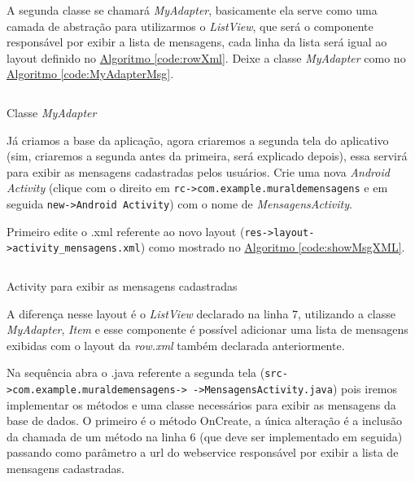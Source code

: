 \documentclass[a4paper,12pt,brazil,oneside]{book}
\begin{document}
A segunda classe se chamará \emph{MyAdapter}, basicamente ela serve como uma camada de abstração para utilizarmos o \emph{ListView}, que será o componente responsável por exibir a lista de mensagens, cada linha da lista será igual ao layout definido no \hyperref[code:rowXml]{Algoritmo \ref*{code:rowXml}}. Deixe a classe \emph{MyAdapter} como no \hyperref[code:MyAdapterMsg]{Algoritmo \ref*{code:MyAdapterMsg}}.

\begin{listing}[H]
	\inputminted[linenos=true,fontsize=\small,frame=lines, framesep=2mm, tabsize=2,numbersep=5pt]{xml}{src/devapp/muraldemensagens/MyAdapter.java}
	\caption{Classe \emph{MyAdapter}}
	\label{code:MyAdapterMsg}
	\end{listing}

Já criamos a base da aplicação, agora criaremos a segunda tela do aplicativo (sim, criaremos a segunda antes da primeira, será explicado depois), essa servirá para exibir as mensagens cadastradas pelos usuários.
Crie uma nova \emph{Android Activity} (clique com o direito em \texttt{rc->com.example.muraldemensagens} e em seguida \texttt{new->Android Activity}) com o nome de \emph{MensagensActivity}.

Primeiro edite o .xml referente ao novo layout (\texttt{res->layout->activity\_mensagens.xml}) como mostrado no \hyperref[code:showMsgXML]{Algoritmo \ref*{code:showMsgXML}}.

\begin{listing}[H]
	\inputminted[linenos=true,fontsize=\small,frame=lines, framesep=2mm, tabsize=2,numbersep=5pt]{xml}{src/devapp/muraldemensagens/mensagens.xml}
	\caption{Activity para exibir as mensagens cadastradas}
	\label{code:showMsgXML}
	\end{listing}
	
A diferença nesse layout é o \emph{ListView} declarado na linha 7, utilizando a classe \emph{MyAdapter}, \emph{Item} e esse componente é possível adicionar uma lista de mensagens exibidas com o layout da \emph{row.xml} também declarada anteriormente.

Na sequência abra o .java referente a segunda tela (\texttt{src->com.example.muraldemensagens-> ->MensagensActivity.java}) pois iremos implementar os métodos e uma classe necessários para exibir as mensagens da base de dados.
O primeiro é o método OnCreate, a única alteração é a inclusão da chamada de um método na linha 6 (que deve ser implementado em seguida) passando como parâmetro a url do webservice responsável por exibir a lista de mensagens cadastradas.
\end{document}
